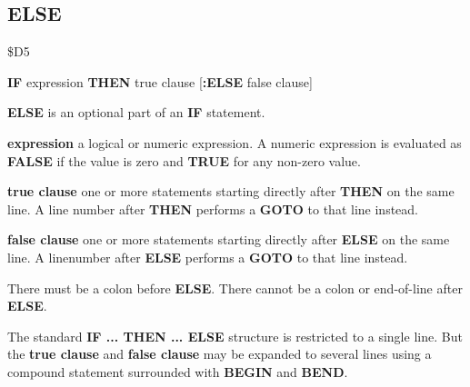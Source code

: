 \subsection{ELSE}
\begin{description}[leftmargin=2cm,style=nextline]
\item [Token:] \$D5
\item [Format:] {\bf IF} expression {\bf THEN} true clause
		[{\bf :ELSE} false clause]
\item [Usage:] {\bf ELSE} is an optional part of an {\bf IF}
               statement.

               {\bf expression} a logical or numeric expression.
               A numeric expression is evaluated as {\bf FALSE}
               if the value is zero and {\bf TRUE} for any non-zero
               value.

               {\bf true clause} one or more statements starting
               directly after {\bf THEN} on the same line.
               A line number after {\bf THEN} performs a
               {\bf GOTO} to that line instead.

               {\bf false clause} one or more statements starting
               directly after {\bf ELSE} on the same line.
               A linenumber after {\bf ELSE} performs a
               {\bf GOTO} to that line instead.

\item [Remarks:]
               There must be a colon before {\bf ELSE}.
               There cannot be a colon or end-of-line after {\bf ELSE}.

               The standard {\bf IF ... THEN ... ELSE} structure
               is restricted to a single line. But the {\bf true clause}
               and {\bf false clause} may be expanded to several lines
               using a compound statement surrounded with
               {\bf BEGIN} and {\bf BEND}.


\end{description}
